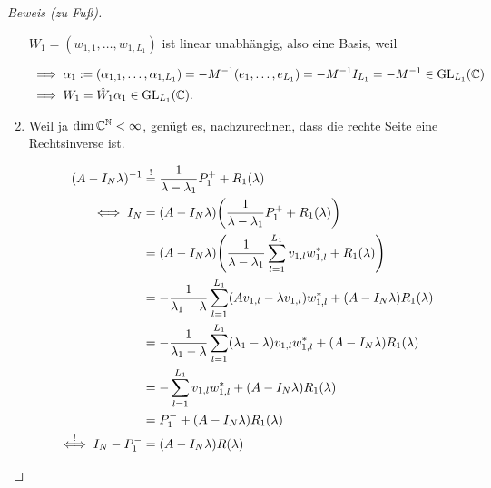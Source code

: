 \begin{proof}[Beweis (zu Fuß)]
\begin{enumerate}[label = (\roman*)]
        $W_1 = (w_{1, 1}, \dots, w_{1, L_1})$ ist linear unabhängig, also eine Basis, weil

        \begin{align*}
            & \implies
            \alpha_1
            :=
            (\alpha_{1, 1}, \dots, \alpha_{1, L_1})
            =
            -M^{-1} (e_1, \dots, e_{L_1})
            =
            -M^{-1} I_{L_1}
            =
            -M^{-1}
            \in
            \operatorname{GL}_{L_1}(\mathbb{C}) \\
            & \implies
            W_1
            =
            \hat W_1 \alpha_1
            \in
            \operatorname{GL}_{L_1}(\mathbb{C}).
        \end{align*}

        \item Weil ja $\dim \mathbb{C}^{\mathbb{N}} < \infty$, genügt es, nachzurechnen, dass die rechte Seite eine Rechtsinverse ist.
        
        \begin{align*}
            (A - I_N \lambda)^{-1}
            & \stackrel{!}{=}
            \frac{1}{\lambda - \lambda_1} P_1^+
            +
            R_1(\lambda) \\
            \iff
            I_N
            & =
            (A - I_N \lambda)
            {\left ( 
                \frac{1}{\lambda - \lambda_1} P_1^+
                +
                R_1(\lambda)
             \right )} \\
            & =
            (A - I_N \lambda)
            {\left ( 
                \frac{1}{\lambda - \lambda_1}
                \sum_{l=1}^{L_1}
                    v_{1, l} w_{1, l}^\ast
                +
                R_1(\lambda)
             \right )} \\
            & =
            -\frac{1}{\lambda_1 - \lambda}
            \sum_{l=1}^{L_1}
                (
                    A v_{1, l}
                    -
                    \lambda v_{1, l}
                )
                w_{1, l}^\ast
            +
            (A - I_N \lambda) R_1(\lambda) \\
            & =
            -\frac{1}{\lambda_1 - \lambda}
            \sum_{l=1}^{L_1}
                (\lambda_1 - \lambda) v_{1, l} w_{1, l}^\ast
            +
            (A - I_N \lambda)
            R_1(\lambda) \\
            & =
            -\sum_{l=1}^{L_1}
                v_{1, l} w_{1, l}^\ast
            +
            (A - I_N \lambda)
            R_1(\lambda) \\
            & =
            P_1^-
            +
            (A - I_N \lambda)
            R_1(\lambda) \\
            \stackrel{!}{\iff}
            I_N - P_1^-
            & =
            (A - I_N \lambda) R(\lambda)
        \end{align*}


\end{enumerate}
\end{proof}

